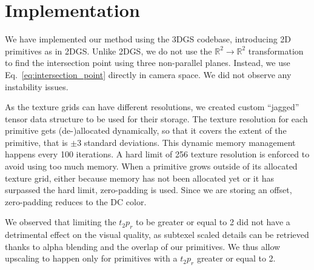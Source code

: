 \section{Implementation}
We have implemented our method using the 3DGS codebase, introducing 2D primitives as in 2DGS. 
Unlike 2DGS,
we do not use the $\mathbb{R}^2 \rightarrow \mathbb{R}^2$ transformation to find the intersection point using three non-parallel planes.
Instead, we use Eq.~\ref{eq:intersection_point} directly in camera space.
We did not observe any instability issues.

As the texture grids can have different resolutions,
we created custom ``jagged'' tensor data structure to be used for their storage.
The texture resolution for each primitive gets (de-)allocated dynamically,
so that it covers the extent of the primitive,
that is $\pm$3 standard deviations.
This dynamic memory management happens every 100 iterations.
A hard limit of 256 texture resolution is enforced to avoid using too much memory.
When a primitive grows outside of its allocated texture grid,
either because memory has not been allocated yet or it has surpassed the hard limit,
zero-padding is used. Since we are storing an offset, zero-padding reduces to the DC color.

We observed that limiting the $t_2p_r$ to be greater or equal to 2 did not have a detrimental effect on the visual quality,
as subtexel scaled details can be retrieved
thanks to alpha blending and the overlap of our primitives.
We thus allow upscaling to happen only for primitives with a $t_2p_r$ greater or equal to 2.


